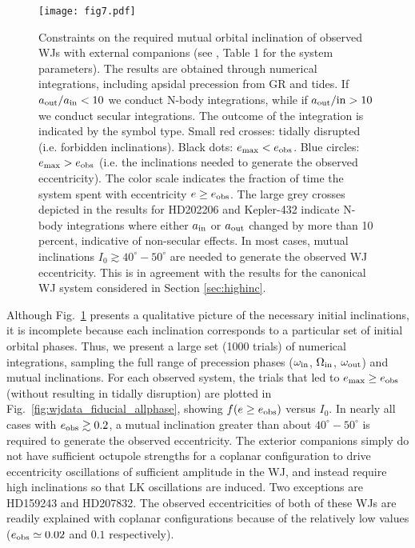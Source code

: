 \documentclass[12pt,useAMS, usenatbib]{mn2e}
\newcommand{\Max}{{\rm max}}
\newcommand{\In}{{\rm in}}
\newcommand{\Out}{{\rm out}}
\newcommand{\emax}{e_\Max}
\newcommand{\eobs}{e_{\rm obs}}
\begin{document}
\begin{figure*}
\centering 
\texttt{[image: fig7.pdf]}
\caption{Constraints on the required mutual orbital inclination of observed WJs with external companions (see \citealt{antonini2016}, Table 1 for the system parameters).  The results are obtained through numerical integrations, including apsidal precession from GR and tides.  If $a_\Out / a_\In < 10$ we conduct N-body integrations, while if $a_\Out / \In > 10$ we conduct secular integrations. The outcome of the integration is indicated by the symbol type.  Small red crosses: tidally disrupted (i.e. forbidden inclinations). Black dots: $\emax < \eobs$. Blue circles: $\emax > \eobs$ (i.e. the inclinations needed to generate the observed eccentricity).  The color scale indicates the fraction of time the system spent with eccentricity $e \geq e_{\rm obs}$.  The large grey crosses depicted in the results for HD202206 and Kepler-432 indicate N-body integrations where either $a_\In$ or $a_\Out$ changed by more than 10 percent, indicative of non-secular effects. In most cases, mutual inclinations $I_0 \gtrsim 40^\circ - 50^\circ$ are needed to generate the observed WJ eccentricity.  This is in agreement with the results for the canonical WJ system considered in Section \ref{sec:highinc}.}
\label{fig:wjdata_fiducial}
\end{figure*}

Although Fig.~\ref{fig:wjdata_fiducial} presents a qualitative picture of the necessary initial inclinations, it is incomplete because each inclination corresponds to a particular set of initial orbital phases. Thus, we present a large set (1000 trials) of numerical integrations, sampling the full range of precession phases ($\omega_\In$, $\Omega_\In$, $\omega_\Out$) and mutual inclinations.  For each observed system, the trials that led to $\emax \geq \eobs$ (without resulting in tidally disruption) are plotted in Fig.~\ref{fig:wjdata_fiducial_allphase}, showing $f(e \geq \eobs)$ versus $I_0$.  In nearly all cases with $\eobs \gtrsim 0.2$, a mutual inclination greater than about $40^\circ - 50^\circ$ is required to generate the observed eccentricity.  The exterior companions simply do not have sufficient octupole strengths for a coplanar configuration to drive eccentricity oscillations of sufficient amplitude in the WJ, and instead require high inclinations so that LK oscillations are induced.  Two exceptions are HD159243 and HD207832.  The observed eccentricities of both of these WJs are readily explained with coplanar configurations because of the relatively low values ($\eobs \simeq 0.02$ and $0.1$ respectively).
 
\end{document}
